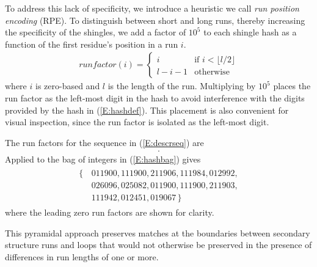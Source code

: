 \documentclass[a4,center,fleqn]{NAR}
\begin{document}
To address this lack of specificity, we introduce a heuristic we call \emph{run position encoding} (RPE). 
To distinguish between short and long runs, thereby increasing the specificity of the shingles, we add a factor of $10^5$ to each shingle hash as a function of the first residue's position in a run $i$. 
\begin{gather}
    runfactor(i) = 
    \begin{cases}
        i               &\text{if $i < \lfloor l/2 \rfloor$}\\
        l - i - 1       &\text{otherwise} 
    \end{cases}
\end{gather}
where $i$ is zero-based and $l$ is the length of the run. 
Multiplying by $10^5$ places the run factor as the left-most digit in the hash to avoid interference with the digits provided by the hash in (\ref{E:hashdef}).
This placement is also convenient for visual inspection, since the run factor is isolated as the left-most digit. 

The run factors for the sequence in (\ref{E:descrseq}) are
\begin{align}
    [\, 0, 1, 2, 1, 0, 0, 0, 0, 1, 2, 1, 0, 0, 0, 0, 0 \,].
\end{align}
Applied to the bag of integers in (\ref{E:hashbag}) gives
\begin{align}\label{E:rpebag}
    \begin{split}
    \{\,&011900, 111900, 211906, 111984, 012992, \\
        &026096, 025082, 011900, 111900, 211903, \\
        &111942, 012451, 019067 \,\}
    \end{split}
\end{align}
where the leading zero run factors are shown for clarity. 

This pyramidal approach preserves matches at the boundaries between secondary structure runs and loops that would not otherwise be preserved in the presence of differences in run lengths of one or more. 
\end{document}
